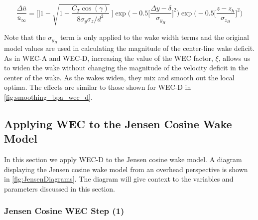 \documentclass{jpconf}
\begin{document}
\begin{equation}
	\frac{\Delta \bar{u}}{\bar{u}_{\infty}} = \Bigg[]1-\sqrt{1-\frac{C_T \cos{(\gamma)}}{8 \sigma_y \sigma_z/d^2}}~\Bigg] \exp{\bigg(-0.5\Big[\frac{\Delta y-\delta}{ \sigma_{y_H}}\Big]^2\bigg)}\exp{\bigg(-0.5\Big[\frac{z-z_h}{ \sigma_{z_H}}\Big]^2\bigg)}
	\label{eq:wechapplied}
\end{equation}

Note that the $\sigma_{y_H}$ term is only applied to the wake width terms and the original model values are used in calculating the magnitude of the center-line wake deficit. As in WEC-A and WEC-D, increasing the value of the WEC factor, $\xi$, allows us to widen the wake without changing the magnitude of the velocity deficit in the center of the wake. As the wakes widen, they mix and smooth out the local optima. The effects are similar to those shown for WEC-D in \cref{fig:smoothing_bpa_wec_d}.


\subsection{Applying WEC to the Jensen Cosine Wake Model}
In this section we apply WEC-D to the Jensen cosine wake model. A diagram displaying the Jensen cosine wake model from an overhead perspective is shown in \cref{fig:JensenDiagrams}. The diagram will give context to the variables and parameters discussed in this section.

\subsubsection{Jensen Cosine WEC Step (1)} 
\end{document}
